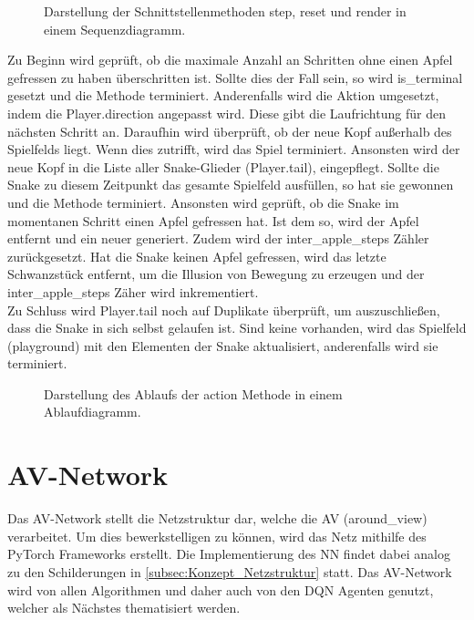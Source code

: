 \begin{figure}[H]
	\centering
	
	\caption[Darstellung der Schnittstellenmethoden in einem Sequenzdiagramm]{Darstellung der Schnittstellenmethoden step, reset und render in einem Sequenzdiagramm.}
	\label{fig:Implementierung_Sequenzdiagram}
\end{figure}
Zu Beginn wird geprüft, ob die maximale Anzahl an Schritten ohne einen Apfel gefressen zu haben überschritten ist. Sollte dies der Fall sein, so wird is\_terminal gesetzt und die Methode terminiert. Anderenfalls wird die Aktion umgesetzt, indem die Player.direction angepasst wird. Diese gibt die Laufrichtung für den nächsten Schritt an. Daraufhin wird überprüft, ob der neue Kopf außerhalb des Spielfelds liegt. Wenn dies zutrifft, wird das Spiel terminiert.
Ansonsten wird der neue Kopf in die Liste aller Snake-Glieder (Player.tail), eingepflegt. Sollte die Snake zu diesem Zeitpunkt das gesamte Spielfeld ausfüllen, so hat sie gewonnen und die Methode terminiert. Ansonsten wird geprüft, ob die Snake im momentanen Schritt einen Apfel gefressen hat. Ist dem so, wird der Apfel entfernt und ein neuer generiert. Zudem wird der inter\_apple\_steps Zähler zurückgesetzt. Hat die Snake keinen Apfel gefressen, wird das letzte Schwanzstück entfernt, um die Illusion von Bewegung zu erzeugen und der inter\_apple\_steps Zäher wird inkrementiert.\\
Zu Schluss wird Player.tail noch auf Duplikate überprüft, um auszuschließen, dass die Snake in sich selbst gelaufen ist. Sind keine vorhanden, wird das Spielfeld (playground) mit den Elementen der Snake aktualisiert, anderenfalls wird sie terminiert.
\begin{figure}[H]
	\centering
	
	\caption[Ablaufdiagramm der action Methode]{Darstellung des Ablaufs der action Methode in einem Ablaufdiagramm.}
	\label{fig:Implementierung_action_method}
\end{figure}

\section{AV-Network} \label{sec:Implementierung_AV_Network}
Das AV-Network stellt die Netzstruktur dar, welche die AV (around\_view) verarbeitet. Um dies bewerkstelligen zu können, wird das Netz mithilfe des PyTorch Frameworks erstellt. Die Implementierung des NN findet dabei analog zu den Schilderungen in \autoref{subsec:Konzept_Netzstruktur} statt. Das AV-Network wird von allen Algorithmen und daher auch von den DQN Agenten genutzt, welcher als Nächstes thematisiert werden.

